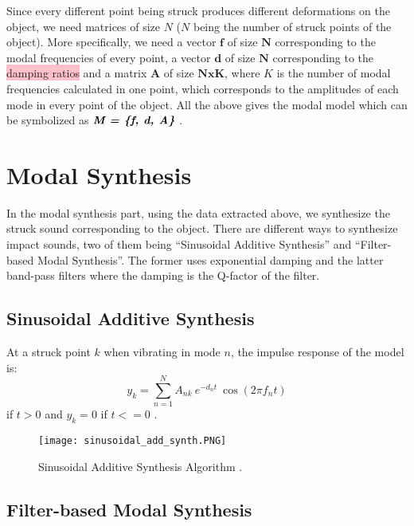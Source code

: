 Since every different point being struck produces different deformations on the object, we need matrices of size $N$ ($N$ being the number of struck points of the object). More specifically, we need a vector $\textbf{f}$ of size $\textbf{N}$ corresponding to the modal frequencies of every point, a vector $\textbf{d}$ of size $\textbf{N}$ corresponding to the \colorbox{pink}{damping ratios} and a matrix $\textbf{A}$ of size $\textbf{NxK}$, where $K$ is the number of modal frequencies calculated in one point, which corresponds to the amplitudes of each mode in every point of the object. All the above gives the modal model which can be symbolized as $\textbf{\textit{M = \{f, d, A\}}}$ \cite{van2001foleyautomatic}.
 
\section{Modal Synthesis}\label{sec:modal_synth}
In the modal synthesis part, using the data extracted above, we synthesize the struck sound corresponding to the object. There are different ways to synthesize impact sounds, two of them being ``Sinusoidal Additive Synthesis'' and ``Filter-based Modal Synthesis''. The former uses exponential damping and the latter band-pass filters where the damping is the Q-factor of the filter. 

\subsection{Sinusoidal Additive Synthesis}\label{sec:sin_synth}
At a struck point $k$ when vibrating in mode $n$, the impulse response of the model is:
\begin{equation}\label{eq:modal_response}
y_k = \sum\limits_{n=1}^{N} A_{nk}\ e^{-d_n t}\ \cos(2 \pi f_nt)
\end{equation}
if $t>0$ and $y_k = 0$ if $t<=0$ \cite{van2001foleyautomatic}.

\begin{figure}[H]
  \centering
    \texttt{[image: sinusoidal\_add\_synth.PNG]}
      \caption{Sinusoidal Additive Synthesis Algorithm \cite{Cook:2002:RSS:515316}.}
      \label{fig:sin_add_synth}
\end{figure}

\subsection{Filter-based Modal Synthesis}\label{sec:add_synth}

